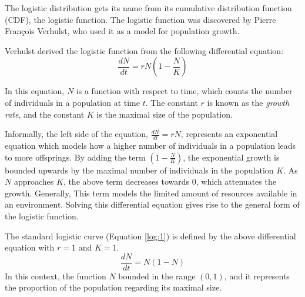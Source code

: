 \documentclass[titlepage,12 pt]{article}
\begin{document}
The logistic distribution gets its name from its cumulative distribution function (CDF), the logistic function.
The logistic function was discovered by Pierre François Verhulst, who used it as a model for population growth.

Verhulst derived the logistic function from the following differential equation:
\[
   \frac{dN}{dt} = rN\left(1-\frac{N}{K}\right)
\]

In this equation, $N$ is a function with respect to time, which counts the number of individuals in a population at time $t$.
The constant $r$ is known as the \textit{growth rate}, and the constant $K$ is the maximal size of the population.

Informally, the left side of the equation, $\frac{dN}{dt} = rN$, represents an exponential equation which models how
a higher number of individuals in a population leads to more offsprings. By adding the term $\left(1 - \frac{N}{K}\right)$, the
exponential growth is bounded upwards by the maximal number of individuals in the population $K$. As $N$ approaches $K$,
the above term decreases towards $0$, which  attenuates the growth. Generally, This term models the limited amount of resources
available in an environment. Solving this differential equation gives rise to the general form of the logistic function.

The standard logistic curve (Equation \ref{log:1}) is defined by the above differential equation with $r = 1$ and $K = 1$.
\begin{equation} \label{log:1}
    \frac{dN}{dt} = N(1-N)
\end{equation}
In this context, the function $N$ bounded in the range $(0, 1)$, and it
represents the proportion of the population regarding its maximal size.
\end{document}
